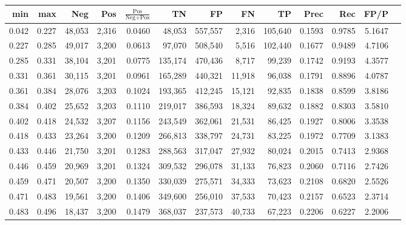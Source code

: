 \begin{tabular}{rrrrrrrrrrrrr}
\toprule
  min &   max &    Neg &   Pos & $\frac{\text{Pos}}{\text{Neg}+\text{Pos}}$ &      TN &      FP &      FN &      TP &   Prec &    Rec &   FP/P \\
\midrule
0.042 & 0.227 & 48,053 & 2,316 &                                     0.0460 &  48,053 & 557,557 &   2,316 & 105,640 & 0.1593 & 0.9785 & 5.1647 \\
0.227 & 0.285 & 49,017 & 3,200 &                                     0.0613 &  97,070 & 508,540 &   5,516 & 102,440 & 0.1677 & 0.9489 & 4.7106 \\
0.285 & 0.331 & 38,104 & 3,201 &                                     0.0775 & 135,174 & 470,436 &   8,717 &  99,239 & 0.1742 & 0.9193 & 4.3577 \\
0.331 & 0.361 & 30,115 & 3,201 &                                     0.0961 & 165,289 & 440,321 &  11,918 &  96,038 & 0.1791 & 0.8896 & 4.0787 \\
0.361 & 0.384 & 28,076 & 3,203 &                                     0.1024 & 193,365 & 412,245 &  15,121 &  92,835 & 0.1838 & 0.8599 & 3.8186 \\
0.384 & 0.402 & 25,652 & 3,203 &                                     0.1110 & 219,017 & 386,593 &  18,324 &  89,632 & 0.1882 & 0.8303 & 3.5810 \\
0.402 & 0.418 & 24,532 & 3,207 &                                     0.1156 & 243,549 & 362,061 &  21,531 &  86,425 & 0.1927 & 0.8006 & 3.3538 \\
0.418 & 0.433 & 23,264 & 3,200 &                                     0.1209 & 266,813 & 338,797 &  24,731 &  83,225 & 0.1972 & 0.7709 & 3.1383 \\
0.433 & 0.446 & 21,750 & 3,201 &                                     0.1283 & 288,563 & 317,047 &  27,932 &  80,024 & 0.2015 & 0.7413 & 2.9368 \\
0.446 & 0.459 & 20,969 & 3,201 &                                     0.1324 & 309,532 & 296,078 &  31,133 &  76,823 & 0.2060 & 0.7116 & 2.7426 \\
0.459 & 0.471 & 20,507 & 3,200 &                                     0.1350 & 330,039 & 275,571 &  34,333 &  73,623 & 0.2108 & 0.6820 & 2.5526 \\
0.471 & 0.483 & 19,561 & 3,200 &                                     0.1406 & 349,600 & 256,010 &  37,533 &  70,423 & 0.2157 & 0.6523 & 2.3714 \\
0.483 & 0.496 & 18,437 & 3,200 &                                     0.1479 & 368,037 & 237,573 &  40,733 &  67,223 & 0.2206 & 0.6227 & 2.2006 \\

\end{tabular}
